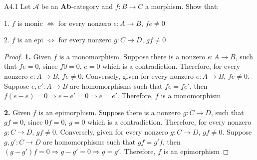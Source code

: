 \documentclass[main]{subfiles}
\begin{document}
\begin{customexercise}{A4.1}
Let $\mathcal A$ be an \textbf{Ab}-category and $f:B\to C$ a morphism. Show that: \par
1. $f$ is monic $\Leftrightarrow$ for every nonzero $e:A\to B$, $fe\neq0$ \par
2. $f$ is an epi $\Leftrightarrow$ for every nonzero $g:C\to D$, $gf\neq0$
\end{customexercise}

\begin{proof} \hfill
\textbf{1.} Given $f$ is a monomorphism. Suppose there is a nonzero $e:A\to B$, such that $fe=0$, since $f0=0$, $e=0$ which is a contradiction. Therefore, for every nonzero $e:A\to B$, $fe\neq0$. Conversely, given for every nonzero $e:A\to B$, $fe\neq0$. Suppose $e,e':A\to B$ are homomorphisms such that $fe=fe'$, then $f(e-e)=0\Rightarrow e-e'=0\Rightarrow e=e'$. Therefore, $f$ is a monomorphism \par
\textbf{2.} Given $f$ is an epimorphism. Suppose there is a nonzero $g:C\to D$, such that $gf=0$, since $0f=0$, $g=0$ which is a contradiction. Therefore, for every nonzero $g:C\to D$, $gf\neq0$. Conversely, given for every nonzero $g:C\to D$, $gf\neq0$. Suppose $g,g':C\to D$ are homomorphisms such that $gf=g'f$, then $(g-g')f=0\Rightarrow g-g'=0\Rightarrow g=g'$. Therefore, $f$ is an epimorphism
\end{proof}
\end{document}
